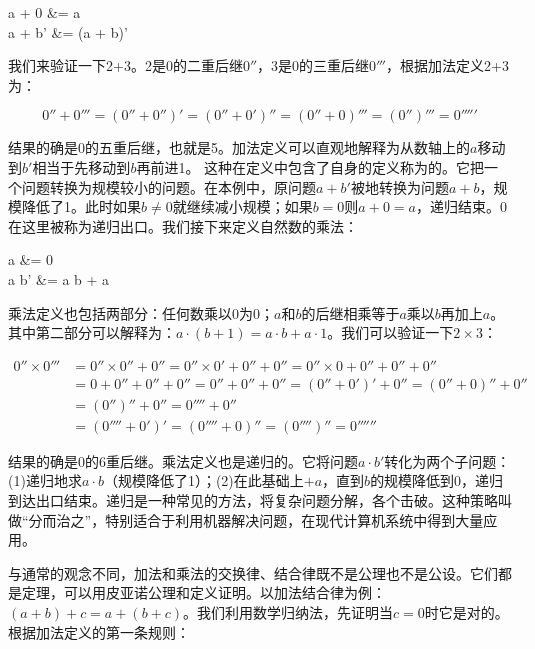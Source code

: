 \documentclass[b5paper]{ctexart}
\begin{document}
\be
\begin{laligned}
a + 0  &= a \\
a + b' &= (a + b)'
\end{laligned}
\label{eq:peano-add}
\ee

我们来验证一下2+3。2是0的二重后继$0''$，3是0的三重后继$0'''$，根据加法定义2+3为：

\[
0'' + 0''' = (0'' + 0'')' = (0'' + 0')'' = (0'' + 0)''' = (0'')''' = 0'''''
\]

结果的确是0的五重后继，也就是5。加法定义可以直观地解释为从数轴上的$a$移动到$b'$相当于先移动到$b$再前进1。
这种在定义中包含了自身的定义称为的。它把一个问题转换为规模较小的问题。在本例中，原问题$a + b'$被地转换为问题$a + b$，规模降低了1。此时如果$b \ne 0$就继续减小规模；如果$b = 0$则$a + 0 = a$，递归结束。0在这里被称为递归出口。我们接下来定义自然数的乘法：

\be
\begin{laligned}
a  &= 0 \\
a \cdot b' &= a \cdot b + a
\end{laligned}
\label{eq:peano-multiply}
\ee

乘法定义也包括两部分：任何数乘以0为0；$a$和$b$的后继相乘等于$a$乘以$b$再加上$a$。其中第二部分可以解释为：$a \cdot (b+1) = a \cdot b + a \cdot 1$。我们可以验证一下$2 \times 3$：

\begin{align*}
0'' \times 0''' & = 0'' \times 0'' + 0'' = 0'' \times 0' + 0'' + 0'' = 0'' \times 0 + 0'' + 0'' + 0'' \\
                & = 0 + 0'' + 0'' + 0'' = 0'' + 0'' + 0'' = (0'' + 0')' + 0'' = (0'' + 0)'' + 0'' \\
                & = (0'')'' + 0'' = 0'''' + 0'' \\
                & = (0'''' + 0')' = (0'''' + 0)'' = (0'''')'' = 0''''''
\end{align*}

结果的确是0的6重后继。乘法定义也是递归的。它将问题$a \cdot b'$转化为两个子问题：(1)递归地求$a \cdot b$（规模降低了1）；(2)在此基础上$+a$，直到$b$的规模降低到0，递归到达出口结束。递归是一种常见的方法，将复杂问题分解，各个击破。这种策略叫做“分而治之”，特别适合于利用机器解决问题，在现代计算机系统中得到大量应用。

 \label{sec:add-assoc}
与通常的观念不同，加法和乘法的交换律、结合律既不是公理也不是公设。它们都是定理，可以用皮亚诺公理和定义证明。以加法结合律为例：$(a + b) + c= a + (b + c)$。我们利用数学归纳法，先证明当$c=0$时它是对的。根据加法定义的第一条规则：
\end{document}
